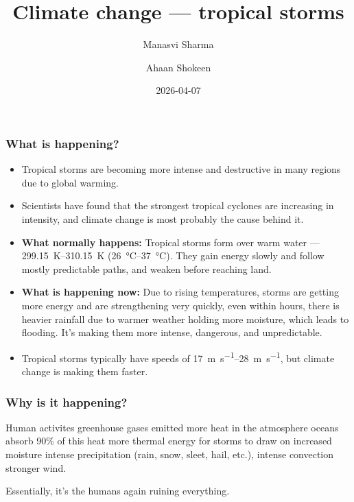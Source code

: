 \documentclass{beamer}
\title{Climate change --- tropical storms}
\author{Manasvi Sharma \and Ahaan Shokeen}
\date{2026-04-07}
\begin{document}
\maketitle

\begin{frame}
    \frametitle{What is happening?}
    \begin{itemize}
        \item Tropical storms are becoming more intense and destructive in many regions due to global warming.
        \item Scientists have found that the strongest tropical cyclones are increasing in intensity, and climate change is most probably the cause behind it.
        \item \textbf{What normally happens:} Tropical storms form over warm water --- \qty{299.15}{\kelvin}--\qty{310.15}{\kelvin} (\qty{26}{\degreeCelsius}--\qty{37}{\degreeCelsius}). They gain energy slowly and follow mostly predictable paths, and weaken before reaching land.
        \item \textbf{What is happening now:} Due to rising temperatures, storms are getting more energy and are strengthening very quickly, even within hours, there is heavier rainfall due to warmer weather holding more moisture, which leads to flooding. It’s making them more intense, dangerous, and unpredictable.
        \item Tropical storms typically have speeds of \qty{17}{\metre\per\second}--\qty{28}{\metre\per\second}, but climate change is making them faster.
    \end{itemize}
\end{frame}

\begin{frame}
    \frametitle{Why is it happening?}
    Human activites \textrightarrow{} greenhouse gases emitted \textrightarrow{} more heat in the atmosphere \textrightarrow{} oceans absorb 90\% of this heat \textrightarrow{} more thermal energy for storms to draw on \textrightarrow{} increased moisture \textrightarrow{} intense precipitation (rain, snow, sleet, hail, etc.), intense convection \textrightarrow{} stronger wind.

    \vspace{5mm}
    Essentially, it's the humans again ruining everything.

\end{frame}
\end{document}
